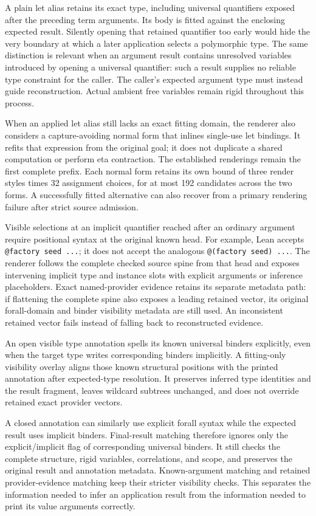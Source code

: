 \documentclass[11pt]{article}
\newcommand{\code}[1]{\texttt{#1}}
\begin{document}
A plain let alias retains its exact type, including universal quantifiers
exposed after the preceding term arguments. Its body is fitted against the
enclosing expected result. Silently opening that retained quantifier too early
would hide the very boundary at which a later application selects a
polymorphic type. The same distinction is relevant when an argument result
contains unresolved variables introduced by opening a universal quantifier:
such a result supplies no reliable type constraint for the caller. The caller's
expected argument type must instead guide reconstruction. Actual ambient free
variables remain rigid throughout this process.

When an applied let alias still lacks an exact fitting domain, the renderer
also considers a capture-avoiding normal form that inlines single-use let
bindings. It refits that expression from the original goal; it does not
duplicate a shared computation or perform eta contraction. The established
renderings remain the first complete prefix. Each normal form retains its
own bound of three render styles times 32 assignment choices, for at most
192 candidates across the two forms. A successfully fitted alternative can
also recover from a primary rendering failure after strict source admission.

Visible selections at an implicit quantifier reached after an ordinary
argument require positional syntax at the original known head. For example,
Lean accepts \code{@factory seed ...}; it does not accept the analogous
\code{@(factory seed) ...}. The renderer follows the complete checked source
spine from that head and exposes intervening implicit type and instance slots
with explicit arguments or inference placeholders. Exact named-provider
evidence retains its separate metadata path: if flattening the complete spine
also exposes a leading retained vector, its original forall-domain and binder
visibility metadata are still used. An inconsistent retained vector fails
instead of falling back to reconstructed evidence.

An open visible type annotation spells its known universal binders explicitly,
even when the target type writes corresponding binders implicitly. A fitting-only
visibility overlay aligns those known structural positions with the printed
annotation after expected-type resolution. It preserves inferred type
identities and the result fragment, leaves wildcard subtrees unchanged, and
does not override retained exact provider vectors.

A closed annotation can similarly use explicit forall syntax while the
expected result uses implicit binders. Final-result matching therefore ignores
only the explicit/implicit flag of corresponding universal binders. It still
checks the complete structure, rigid variables, correlations, and scope, and
preserves the original result and annotation metadata. Known-argument matching
and retained provider-evidence matching keep their stricter visibility checks.
This separates the information needed to infer an application result from the
information needed to print its value arguments correctly.
\end{document}
